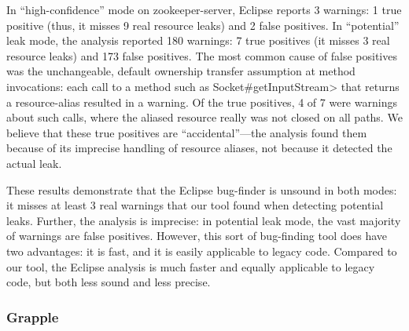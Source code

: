 In ``high-confidence'' mode on zookeeper-server, Eclipse reports 3
warnings: 1 true positive (thus, it misses 9 real resource leaks) and 2
false positives.
In ``potential'' leak mode, the analysis reported 180
warnings:  7 true positives (it misses 3 real resource leaks) and 173 false
positives.
The most common cause of false
positives was the unchangeable, default ownership transfer assumption
at method invocations: each call to a method such as
\<Socket\#getInputStream> that returns a resource-alias resulted in a
warning.
Of the true positives, 4 of 7 were warnings about such
calls, where the aliased resource really was not closed on all
paths. We believe that these true positives are ``accidental''---the
analysis found them because of its imprecise handling of resource
aliases, not because it detected the actual leak.

These results demonstrate that the Eclipse bug-finder is unsound in both
modes: it misses at least 3 real warnings that our tool found when detecting
potential leaks. Further, the analysis is imprecise: in potential leak mode,
the vast majority of warnings are false positives. However, this sort
of bug-finding tool does have two advantages: it is fast, and it is easily
applicable to legacy code. Compared to our tool, the Eclipse analysis
is much faster and equally applicable to legacy code, but both less sound
and less precise.


\subsubsection{Grapple}
\label{sec:grapple}

\newcommand{\grappletablerow}[4]{\textbf{\smaller{#1}} & #2 & #3 & #4}

